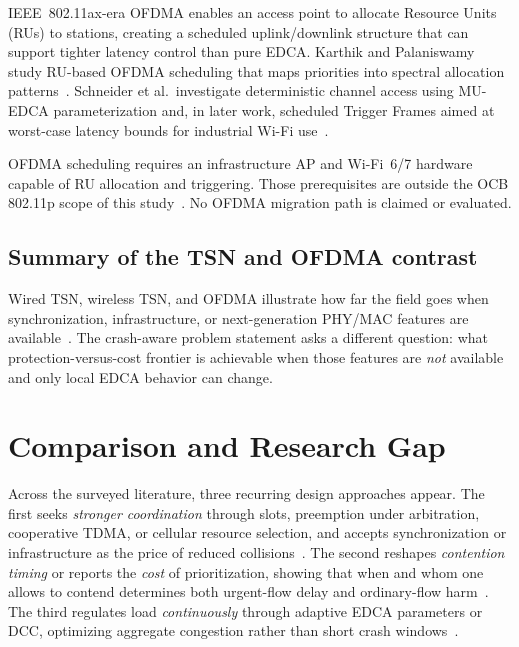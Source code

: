 IEEE~802.11ax-era OFDMA enables an access point to allocate Resource Units (RUs) to stations, creating a scheduled uplink/downlink structure that can support tighter latency control than pure EDCA.
Karthik and Palaniswamy study RU-based OFDMA scheduling that maps priorities into spectral allocation patterns~\cite{karthik2018}.
Schneider et al.\ investigate deterministic channel access using MU-EDCA parameterization and, in later work, scheduled Trigger Frames aimed at worst-case latency bounds for industrial Wi-Fi use~\cite{schneider_mu_edca_2023,schneider_trigger_2024}.

OFDMA scheduling requires an infrastructure AP and Wi-Fi~6/7 hardware capable of RU allocation and triggering.
Those prerequisites are outside the OCB 802.11p scope of this study~\cite{jiang2008ieee80211p,IEEE80211}.
No OFDMA migration path is claimed or evaluated.

\subsection{Summary of the TSN and OFDMA contrast}
\label{sec:rw:tsn-synth}

Wired TSN, wireless TSN, and OFDMA illustrate how far the field goes when synchronization, infrastructure, or next-generation PHY/MAC features are available~\cite{ieee8021qbv,seliem2023wirelesstsn,schneider_trigger_2024}.
The crash-aware problem statement asks a different question: what protection-versus-cost frontier is achievable when those features are \emph{not} available and only local EDCA behavior can change.

\section{Comparison and Research Gap}
\label{sec:rw:gap}

Across the surveyed literature, three recurring design approaches appear.
The first seeks \emph{stronger coordination} through slots, preemption under arbitration, cooperative TDMA, or cellular resource selection, and accepts synchronization or infrastructure as the price of reduced collisions~\cite{TSNCtl_Feraudo,PRP_MAC_Li,CFC_MAC_Linn,CV2X_Sidelink_Allocation}.
The second reshapes \emph{contention timing} or reports the \emph{cost} of prioritization, showing that when and whom one allows to contend determines both urgent-flow delay and ordinary-flow harm~\cite{SkipCCH_Garrido,Continuous_Backoff_Freezing_Li,Evolution_QoS_Mechanisms}.
The third regulates load \emph{continuously} through adaptive EDCA parameters or DCC, optimizing aggregate congestion rather than short crash windows~\cite{romdhani2003AdaptiveEDCF,etsi_dcc_2018}.

